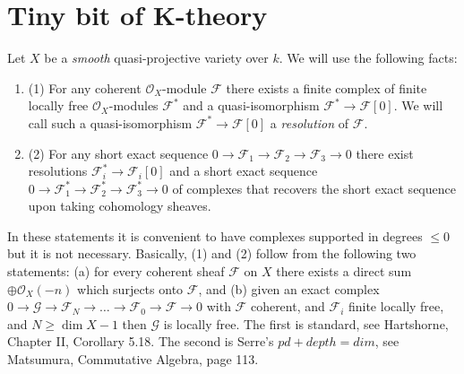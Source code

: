 \section{Tiny bit of K-theory}
\label{section-bit-K-theory}

\noindent
Let $X$ be a {\it smooth}
quasi-projective variety over $k$. We will use the
following facts:
\begin{enumerate}
\item{(1)} For any coherent ${\mathcal O}_X$-module ${\mathcal F}$
there exists a finite complex of finite locally free
${\mathcal O}_X$-modules ${\mathcal F}^*$ and a quasi-isomorphism
${\mathcal F}^* \to {\mathcal F}[0]$. We will call such a quasi-isomorphism
${\mathcal F}^* \to {\mathcal F}[0]$ a {\it resolution} of ${\mathcal F}$.
\item{(2)} For any short exact sequence
$
0
\to
{\mathcal F}_1
\to 
{\mathcal F}_2
\to 
{\mathcal F}_3
\to 
0
$
there exist resolutions ${\mathcal F}_i^* \to {\mathcal F}_i[0]$
and a short exact sequence 
$
0
\to
{\mathcal F}_1^*
\to 
{\mathcal F}_2^*
\to 
{\mathcal F}_3^*
\to 
0
$
of complexes that recovers the short exact sequence
upon taking cohomology sheaves.
\end{enumerate}
In these statements it is convenient to have complexes supported in
degrees $\leq 0$ but it is not necessary. 
Basically, (1) and (2) follow from the following two statements:
(a) for every coherent sheaf ${\mathcal F}$ on $X$ there exists a direct
sum $\oplus {\mathcal O}_X(-n)$ which surjects onto ${\mathcal F}$, and
(b) given an exact complex $0\to {\mathcal G} \to {\mathcal F}_{N}
\to \ldots \to {\mathcal F}_0 \to {\mathcal F} \to 0$ with ${\mathcal F}$
coherent, and ${\mathcal F}_i$ finite locally free, and $N \geq \dim X -1$
then ${\mathcal G}$ is locally free. The first is standard, see
Hartshorne, Chapter II, Corollary 5.18. The second is Serre's
$pd+depth=dim$, see Matsumura, Commutative Algebra, page 113.

